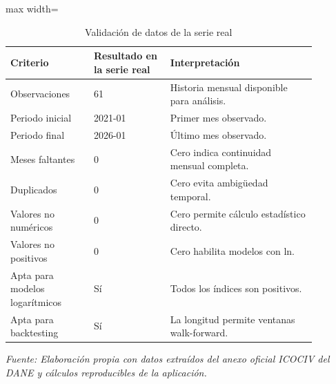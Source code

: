 \begin{table}[H]
\centering
\caption{Validación de datos de la serie real}
\label{tab:ejemplo_validacion_vias_urbanas}
\scriptsize
\begin{adjustbox}{max width=\linewidth}
\begin{tabular}{p{0.24\linewidth}p{0.22\linewidth}p{0.42\linewidth}}
\toprule
Criterio & Resultado en la serie real & Interpretación \\
\midrule
Observaciones & 61 & Historia mensual disponible para análisis. \\
Periodo inicial & 2021-01 & Primer mes observado. \\
Periodo final & 2026-01 & Último mes observado. \\
Meses faltantes & 0 & Cero indica continuidad mensual completa. \\
Duplicados & 0 & Cero evita ambigüedad temporal. \\
Valores no numéricos & 0 & Cero permite cálculo estadístico directo. \\
Valores no positivos & 0 & Cero habilita modelos con ln. \\
Apta para modelos logarítmicos & Sí & Todos los índices son positivos. \\
Apta para backtesting & Sí & La longitud permite ventanas walk-forward. \\
\bottomrule
\end{tabular}
\end{adjustbox}
\par\footnotesize\textit{Fuente: Elaboración propia con datos extraídos del anexo oficial ICOCIV del DANE y cálculos reproducibles de la aplicación.}
\end{table}
